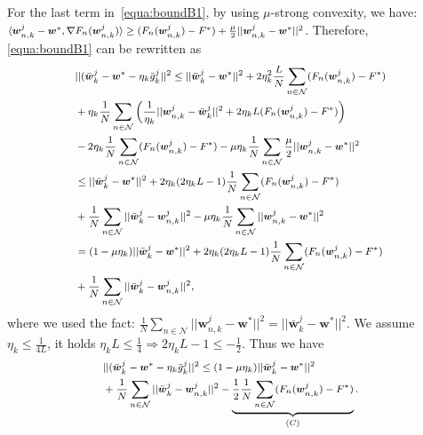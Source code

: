  For the last term in~\eqref{equa:boundB1}, by using $\mu$-strong convexity, we have: $\footnotesize \langle \boldsymbol{w}_{n,k}^j - \boldsymbol{w}^*,\nabla F_{n}(\boldsymbol{w}_{n,k}^j) \rangle \geq (F_{n}(\boldsymbol{w}_{n,k}^j) - F^*) +\frac{\mu}{2}||\boldsymbol{w}_{n,k}^j - \boldsymbol{w}^*||^2$. Therefore, \eqref{equa:boundB1} can be rewritten as
\begin{equation} \label{Equa:subB1}
\footnotesize
\begin{aligned}
&||(\bar{\boldsymbol{w}}_k^j - \boldsymbol{w}^* -\eta_k\bar{g}_k^j||^2 
\leq ||\bar{\boldsymbol{w}}_k^j - \boldsymbol{w}^*||^2 + 
 2\eta_k^2\frac{L}{N} \sum_{n\in\mathcal{N}}(F_{n}(\boldsymbol{w}_{n,k}^j) - F^*) 
\\&+ \eta_k\frac{1}{N} \sum_{n\in\mathcal{N}} \left(\frac{1}{\eta_k} ||\boldsymbol{w}_{n,k}^j - \bar{\boldsymbol{w}}_k^j||^2 + 2\eta_k L (F_{n}(\boldsymbol{w}_{n,k}^j) - F^*) \right) 
\\&-2\eta_k \frac{1}{N} \sum_{n\in\mathcal{N}}(F_{n}(\boldsymbol{w}_{n,k}^j) - F^*) -\mu\eta_k \frac{1}{N} \sum_{n\in\mathcal{N}}\frac{\mu}{2}||\boldsymbol{w}_{n,k}^j - \boldsymbol{w}^*||^2
\\&\leq ||\bar{\boldsymbol{w}}_k^j - \boldsymbol{w}^*||^2 + 2\eta_k(2\eta_kL-1) \frac{1}{N} \sum_{n\in\mathcal{N}}(F_{n}(\boldsymbol{w}_{n,k}^j) - F^*) 
\\&+ \frac{1}{N} \sum_{n\in\mathcal{N}}||\bar{\boldsymbol{w}}_k^j-\boldsymbol{w}_{n,k}^j||^2-\mu\eta_k \frac{1}{N} \sum_{n\in\mathcal{N}}||\boldsymbol{w}_{n,k}^j - \boldsymbol{w}^*||^2
\\&= (1-\mu\eta_k)||\bar{\boldsymbol{w}}_k^j - \boldsymbol{w}^*||^2 + 2\eta_k(2\eta_kL-1) \frac{1}{N} \sum_{n\in\mathcal{N}}(F_{n}(\boldsymbol{w}_{n,k}^j) - F^*) 
\\&+ \frac{1}{N}\sum_{n\in\mathcal{N}}||\bar{\boldsymbol{w}}_k^j-\boldsymbol{w}_{n,k}^j||^2,
\end{aligned}
\end{equation}
where we used the fact: $\frac{1}{N} \sum_{n\in\mathcal{N}}||\boldsymbol{w}_{n,k}^j - \boldsymbol{w}^*||^2 = ||\bar{\boldsymbol{w}}_k^j - \boldsymbol{w}^*||^2$. We assume $\eta_k \leq \frac{1}{4L}$, it holds $\eta_kL \leq \frac{1}{4} \Longrightarrow 2\eta_kL -1 \leq -\frac{1}{2}$. Thus we have \vspace{-10pt}
\begin{equation} \label{equa:Cterm}
\footnotesize
\begin{aligned}
&||(\bar{\boldsymbol{w}}_k^j - \boldsymbol{w}^* -\eta_k\bar{g}_k^j||^2 \leq (1-\mu\eta_k)||\bar{\boldsymbol{w}}_k^j - \boldsymbol{w}^*||^2  
\\&+ \frac{1}{N}\sum_{n\in\mathcal{N}}||\bar{\boldsymbol{w}}_k^j-\boldsymbol{w}_{n,k}^j||^2- \underbrace{\frac{1}{2} \frac{1}{N} \sum_{n\in\mathcal{N}}(F_{n}(\boldsymbol{w}_{n,k}^j) - F^*)}_{(C)}.
\end{aligned}
\end{equation}
